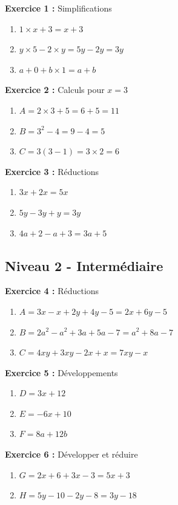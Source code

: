 \begin{correctionbox}
	\textbf{Exercice 1 :} Simplifications
	\begin{enumerate}[label=\alph*)]
		\item $1 \times x + 3 = x + 3$
		\item $y \times 5 - 2 \times y = 5y - 2y = 3y$
		\item $a + 0 + b \times 1 = a + b$
	\end{enumerate}
	
	\textbf{Exercice 2 :} Calculs pour $x = 3$
	\begin{enumerate}[label=\alph*)]
		\item $A = 2 \times 3 + 5 = 6 + 5 = 11$
		\item $B = 3^2 - 4 = 9 - 4 = 5$
		\item $C = 3(3 - 1) = 3 \times 2 = 6$
	\end{enumerate}
	
	\textbf{Exercice 3 :} Réductions
	\begin{enumerate}[label=\alph*)]
		\item $3x + 2x = 5x$
		\item $5y - 3y + y = 3y$
		\item $4a + 2 - a + 3 = 3a + 5$
	\end{enumerate}
\end{correctionbox}

\subsection{Niveau 2 - Intermédiaire}

\begin{correctionbox}
	\textbf{Exercice 4 :} Réductions
	\begin{enumerate}[label=\alph*)]
		\item $A = 3x - x + 2y + 4y - 5 = 2x + 6y - 5$
		\item $B = 2a^2 - a^2 + 3a + 5a - 7 = a^2 + 8a - 7$
		\item $C = 4xy + 3xy - 2x + x = 7xy - x$
	\end{enumerate}
	
	\textbf{Exercice 5 :} Développements
	\begin{enumerate}[label=\alph*)]
		\item $D = 3x + 12$
		\item $E = -6x + 10$
		\item $F = 8a + 12b$
	\end{enumerate}
	
	\textbf{Exercice 6 :} Développer et réduire
	\begin{enumerate}[label=\alph*)]
		\item $G = 2x + 6 + 3x - 3 = 5x + 3$
		\item $H = 5y - 10 - 2y - 8 = 3y - 18$
	\end{enumerate}
\end{correctionbox}

